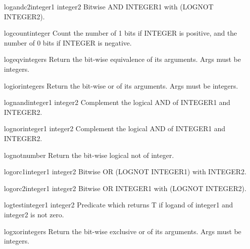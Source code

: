 \documentclass[10pt,english]{book}
\begin{document}
\begin{function}{logandc2}{integer1 integer2}
  Bitwise AND INTEGER1 with (LOGNOT INTEGER2).
\end{function}

\begin{function}{logcount}{integer}
  Count the number of 1 bits if INTEGER is positive, and the number of 0 bits
  if INTEGER is negative.
\end{function}

\begin{function}{logeqv}{\rest integers}
  Return the bit-wise equivalence of its arguments. Args must be integers.
\end{function}

\begin{function}{logior}{\rest integers}
  Return the bit-wise or of its arguments. Args must be integers.
\end{function}

\begin{function}{lognand}{integer1 integer2}
  Complement the logical AND of INTEGER1 and INTEGER2.
\end{function}

\begin{function}{lognor}{integer1 integer2}
  Complement the logical AND of INTEGER1 and INTEGER2.
\end{function}

\begin{function}{lognot}{number}
  Return the bit-wise logical not of integer.
\end{function}

\begin{function}{logorc1}{integer1 integer2}
  Bitwise OR (LOGNOT INTEGER1) with INTEGER2.
\end{function}

\begin{function}{logorc2}{integer1 integer2}
  Bitwise OR INTEGER1 with (LOGNOT INTEGER2).
\end{function}

\begin{function}{logtest}{integer1 integer2}
  Predicate which returns T if logand of integer1 and integer2 is not zero.
\end{function}

\begin{function}{logxor}{\rest integers}
  Return the bit-wise exclusive or of its arguments. Args must be integers.
\end{function}
\end{document}
